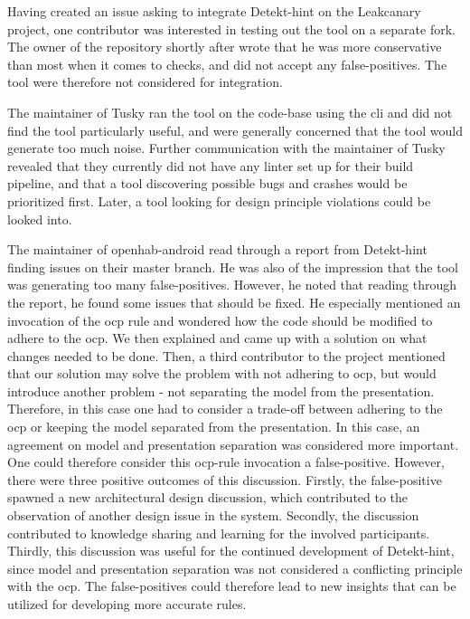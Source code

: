 \documentclass[pdftex,10pt,b5paper,twoside]{report}
\begin{document}
Having created an issue asking to integrate Detekt-hint on the Leakcanary project, one contributor was interested in testing out the tool on a separate fork. The owner of the repository shortly after wrote that he was more conservative than most when it comes to checks, and did not accept any false-positives. The tool were therefore not considered for integration.

The maintainer of Tusky\cite{tusky} ran the tool on the code-base using the \gls{cli} and did not find the tool particularly useful, and were generally concerned that the tool would generate too much noise. Further communication with the maintainer of Tusky revealed that they currently did not have any linter set up for their build pipeline, and that a tool discovering possible bugs and crashes would be prioritized first. Later, a tool looking for design principle violations could be looked into.

The maintainer of openhab-android\cite{openhab} read through a report from Detekt-hint finding issues on their master branch. He was also of the impression that the tool was generating too many false-positives. However, he noted that reading through the report, he found some issues that should be fixed. He especially mentioned an invocation of the \gls{ocp} rule and wondered how the code should be modified to adhere to the \gls{ocp}. We then explained and came up with a solution on what changes needed to be done. Then, a third contributor to the project mentioned that our solution may solve the problem with not adhering to \gls{ocp}, but would introduce another problem - not separating the model from the presentation. Therefore, in this case one had to consider a trade-off between adhering to the \gls{ocp} or keeping the model separated from the presentation. In this case, an agreement on model and presentation separation was considered more important. One could therefore consider this \gls{ocp}-rule invocation a false-positive.  However, there were three positive outcomes of this discussion. Firstly, the false-positive spawned a new architectural design discussion, which contributed to the observation of another design issue in the system. Secondly, the discussion contributed to knowledge sharing and learning for the involved participants.
Thirdly, this discussion was useful for the continued development of Detekt-hint, since model and presentation separation was not considered a conflicting principle with the \gls{ocp}. The false-positives could therefore lead to new insights that can be utilized for developing more accurate rules. 
\end{document}
